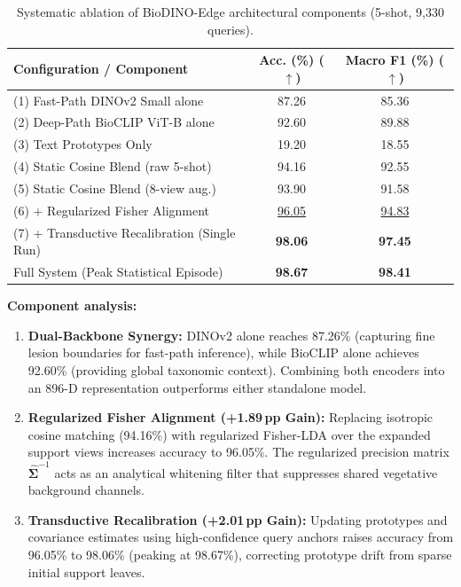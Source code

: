 \documentclass[preprint,12pt]{elsarticle}
\begin{document}
\begin{table}[htbp]
\caption{Systematic ablation of BioDINO-Edge architectural components (5-shot, 9,330 queries).}
\label{tab:ablation}
\centering

\footnotesize
\setlength{\tabcolsep}{3pt}
\begin{tabular*}{\columnwidth}{@{\extracolsep{\fill}}lcc}
\toprule
\textbf{Configuration / Component} & \textbf{Acc. (\%) ($\uparrow$)} & \textbf{Macro F1 (\%) ($\uparrow$)} \\
\midrule
(1) Fast-Path DINOv2 Small alone & 87.26 & 85.36 \\
(2) Deep-Path BioCLIP ViT-B alone & 92.60 & 89.88 \\
(3) Text Prototypes Only & 19.20 & 18.55 \\
(4) Static Cosine Blend (raw 5-shot) & 94.16 & 92.55 \\
(5) Static Cosine Blend (8-view aug.) & 93.90 & 91.58 \\
(6) + Regularized Fisher Alignment & \underline{96.05} & \underline{94.83} \\
(7) + Transductive Recalibration (Single Run) & \textbf{98.06} & \textbf{97.45} \\
\midrule
Full System (Peak Statistical Episode) & \textbf{98.67} & \textbf{98.41} \\
\bottomrule
\end{tabular*}
\end{table}

\textbf{Component analysis:}
\begin{enumerate}
    \item \textbf{Dual-Backbone Synergy:} DINOv2 alone reaches 87.26\% (capturing fine lesion boundaries for fast-path inference), while BioCLIP alone achieves 92.60\% (providing global taxonomic context). Combining both encoders into an 896-D representation outperforms either standalone model.
    \item \textbf{Regularized Fisher Alignment (+1.89\,pp Gain):} Replacing isotropic cosine matching (94.16\%) with regularized Fisher-LDA over the expanded support views increases accuracy to 96.05\%. The regularized precision matrix $\hat{\mathbf{\Sigma}}^{-1}$ acts as an analytical whitening filter that suppresses shared vegetative background channels.
    \item \textbf{Transductive Recalibration (+2.01\,pp Gain):} Updating prototypes and covariance estimates using high-confidence query anchors raises accuracy from 96.05\% to 98.06\% (peaking at 98.67\%), correcting prototype drift from sparse initial support leaves.
\end{enumerate}
\end{document}
